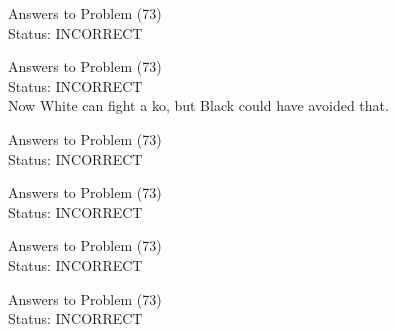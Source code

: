 \documentclass[11pt]{article}
\begin{document}
\begin{minipage}[t]{0.5\textwidth}
  {\centering
  
  Answers to Problem (73)\\
  Status: INCORRECT\\
  
  }
\end{minipage}
\begin{minipage}[t]{0.5\textwidth}
  {\centering
  
  Answers to Problem (73)\\
  Status: INCORRECT\\
  Now White can fight a ko, but Black could have avoided that.\\
  }
\end{minipage}
\begin{minipage}[t]{0.5\textwidth}
  {\centering
  
  Answers to Problem (73)\\
  Status: INCORRECT\\
  
  }
\end{minipage}
\begin{minipage}[t]{0.5\textwidth}
  {\centering
  
  Answers to Problem (73)\\
  Status: INCORRECT\\
  
  }
\end{minipage}
\begin{minipage}[t]{0.5\textwidth}
  {\centering
  
  Answers to Problem (73)\\
  Status: INCORRECT\\
  
  }
\end{minipage}
\begin{minipage}[t]{0.5\textwidth}
  {\centering
  
  Answers to Problem (73)\\
  Status: INCORRECT\\
  
  }
\end{minipage}
\end{document}
